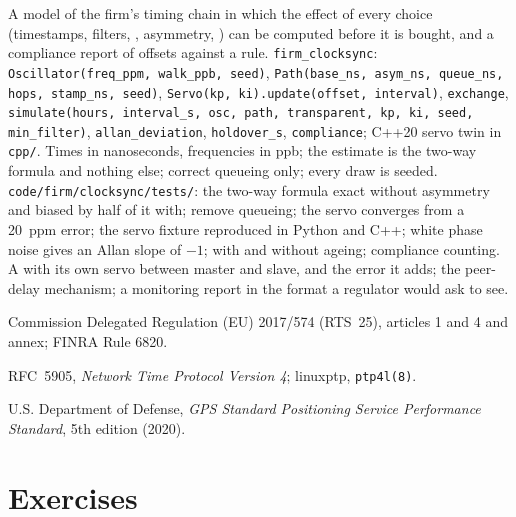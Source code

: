 \begin{build}
 A model of the firm's timing chain in which the effect of every choice (timestamps, filters, ,
asymmetry, ) can be computed before it is bought, and a compliance report of offsets against a rule.
 \texttt{firm\_clocksync}: \texttt{Oscillator(freq\_ppm, walk\_ppb, seed)}, \texttt{Path(base\_ns, asym\_ns,
queue\_ns, hops, stamp\_ns, seed)}, \texttt{Servo(kp, ki).update(offset, interval)}, \texttt{exchange}, \texttt{simulate(hours,
interval\_s, osc, path, transparent, kp, ki, seed, min\_filter)}, \texttt{allan\_deviation}, \texttt{holdover\_s}, \texttt{compliance};
C++20 servo twin in \texttt{cpp/}.
 Times in nanoseconds, frequencies in ppb; the estimate is the two-way formula and nothing else; 
correct queueing only; every draw is seeded.
 \texttt{code/firm/clocksync/tests/}: the two-way formula exact without asymmetry and biased by half of it with;
 remove queueing; the servo converges from a 20~ppm error; the servo fixture reproduced in Python and C++; white phase
noise gives an Allan slope of $-1$;  with and without ageing; compliance counting.
 A  with its own servo between master and slave, and the error it adds; the peer-delay mechanism; a
monitoring report in the format a regulator would ask to see.
\end{build}

\begin{omsources}
\item Commission Delegated Regulation (EU) 2017/574 (RTS~25), articles 1 and 4 and annex; FINRA Rule 6820.
\item RFC~5905, \emph{Network Time Protocol Version 4}; linuxptp, \texttt{ptp4l(8)}.
\item U.S. Department of Defense, \emph{GPS Standard Positioning Service Performance Standard}, 5th edition (2020).
\end{omsources}

\section{Exercises}

